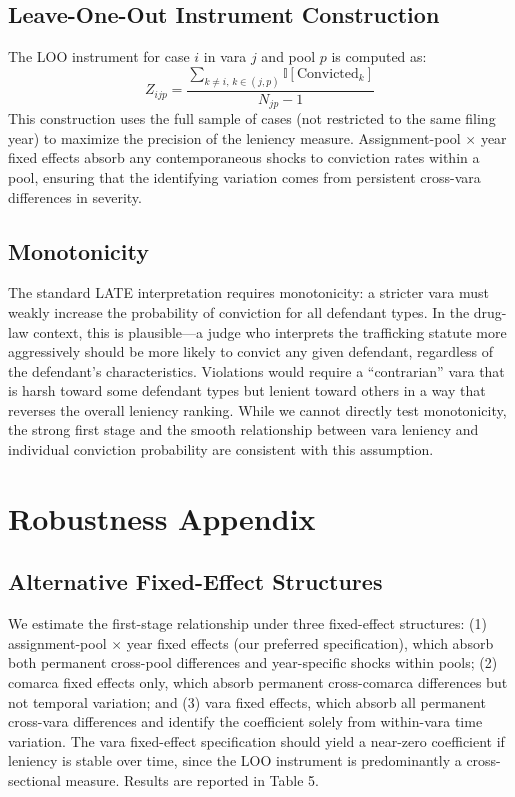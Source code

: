 \documentclass[12pt]{article}
\newcommand{\ind}{\mathbb{I}}
\begin{document}
\subsection{Leave-One-Out Instrument Construction}

The LOO instrument for case $i$ in vara $j$ and pool $p$ is computed as:
\[
Z_{ijp} = \frac{\sum_{k \neq i,\, k \in (j,p)} \ind[\text{Convicted}_k]}{N_{jp} - 1}
\]
This construction uses the full sample of cases (not restricted to the same filing year) to maximize the precision of the leniency measure. Assignment-pool $\times$ year fixed effects absorb any contemporaneous shocks to conviction rates within a pool, ensuring that the identifying variation comes from persistent cross-vara differences in severity.

\subsection{Monotonicity}

The standard LATE interpretation requires monotonicity: a stricter vara must weakly increase the probability of conviction for all defendant types. In the drug-law context, this is plausible---a judge who interprets the trafficking statute more aggressively should be more likely to convict any given defendant, regardless of the defendant's characteristics. Violations would require a ``contrarian'' vara that is harsh toward some defendant types but lenient toward others in a way that reverses the overall leniency ranking. While we cannot directly test monotonicity, the strong first stage and the smooth relationship between vara leniency and individual conviction probability are consistent with this assumption.

\section{Robustness Appendix}
\label{app:robustness}

\subsection{Alternative Fixed-Effect Structures}

We estimate the first-stage relationship under three fixed-effect structures: (1) assignment-pool $\times$ year fixed effects (our preferred specification), which absorb both permanent cross-pool differences and year-specific shocks within pools; (2) comarca fixed effects only, which absorb permanent cross-comarca differences but not temporal variation; and (3) vara fixed effects, which absorb all permanent cross-vara differences and identify the coefficient solely from within-vara time variation. The vara fixed-effect specification should yield a near-zero coefficient if leniency is stable over time, since the LOO instrument is predominantly a cross-sectional measure. Results are reported in Table 5.
\end{document}
